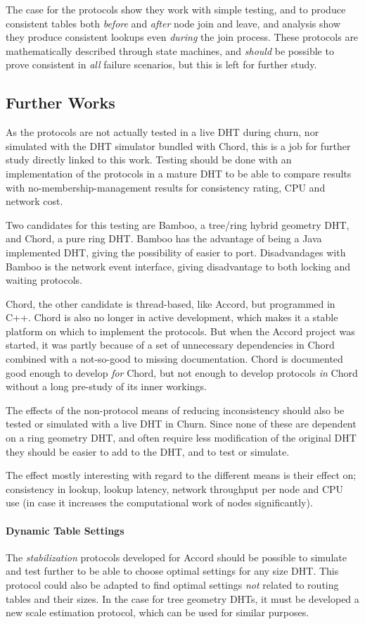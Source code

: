 The case for the protocols show they work with simple testing,
 and to produce consistent tables
 both \emph{before} and \emph{after} node join and leave, and analysis show they
 produce consistent lookups even \emph{during} the join process. These protocols
 are mathematically described through state machines, and \emph{should} be possible to
 prove consistent in \emph{all} failure scenarios, but this is left for further study.

\subsection{Further Works}

As the protocols are not actually tested in a live DHT during churn, nor simulated
 with the DHT simulator bundled with Chord\cite{chord-homepage}, this is a job for
 further study directly linked to this work. Testing should be done with an
 implementation of the protocols in a mature DHT to be able to compare results
 with no-membership-management results for consistency rating, CPU and network cost.

Two candidates for this testing are Bamboo, a tree/ring hybrid geometry DHT, and
 Chord, a pure ring DHT. Bamboo has the advantage of being a Java implemented
 DHT, giving the possibility of easier to port. Disadvandages with Bamboo is
 the network event interface, giving disadvantage to both locking and waiting
 protocols.

Chord, the other candidate is thread-based, like Accord, but programmed in C++.
 Chord is also no longer in active development, which makes it a stable platform
 on which to implement the protocols. But when the Accord project was started, it
 was partly because of a set of unnecessary dependencies in Chord combined with
 a not-so-good to missing documentation. Chord is documented good enough to
 develop \emph{for} Chord, but not enough to develop protocols \emph{in} Chord
 without a long pre-study of its inner workings.

The effects of the non-protocol means of reducing inconsistency should also be
 tested or simulated with a live DHT in Churn. Since none of these are dependent
 on a ring geometry DHT, and often require less modification of the original DHT
 they should be easier to add to the DHT, and to test or simulate.

The effect mostly interesting with regard to the different means is their
 effect on; consistency in lookup, lookup latency, network throughput per node
 and CPU use (in case it increases the computational work of nodes significantly).

\paragraph{Dynamic Table Settings}
The \emph{stabilization} protocols developed for Accord should be possible to
 simulate and test further to be able to choose optimal settings for any size
 DHT. This protocol could also be adapted to find optimal settings \emph{not}
 related to routing tables and their sizes. In the case for tree geometry
 DHTs, it must be developed a new scale estimation protocol, which can be used
 for similar purposes.
